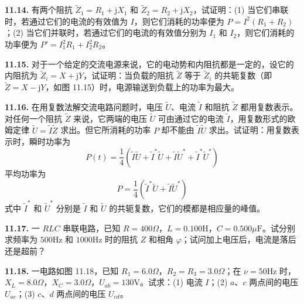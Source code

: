\begin{center}
\end{center}

\vfill
\newpage

\textbf{11.14.} 有两个阻抗 $\widetilde{Z}_1 = R_1 + \mathrm{j}X_1$ 和 $\widetilde{Z}_2 = R_2 + \mathrm{j}X_2$，试证明：(1) 当它们串联时，若通过它们的电流的有效值为 $I$，则它们消耗的功率便为 $P = I^2(R_1 + R_2)$；(2) 当它们并联时，若通过它们的电流的有效值分别为 $I_1$ 和 $I_2$，则它们消耗的功率便为 $P' = I_1^2 R_1 + I_2^2 R_2$。

\vfill
\newpage

\textbf{11.15.} 对于一个给定的交流电源来说，它的电动势和内阻抗都是一定的，设它的内阻抗为 $\widetilde{Z}_{i} = X + \mathrm{j}Y$，试证明：当负载的阻抗 $\widetilde{Z}$ 等于 $\widetilde{Z}_{i}$ 的共轭复数（即 $\widetilde{Z} = X - \mathrm{j}Y$，如图 11.15）时，电源输送到负载上的功率为最大。

\begin{center}
\end{center}

\vfill
\newpage

\textbf{11.16.} 在用复数法解交流电路问题时，电压 $\widetilde{U}$、电流 $\widetilde{I}$ 和阻抗 $\widetilde{Z}$ 都用复数表示。对任何一个阻抗 $\widetilde{Z}$ 来说，它两端的电压 $\widetilde{U}$ 可由通过它的电流 $\widetilde{I}$，用复数形式的欧姆定律 $\widetilde{U} = \widetilde{I}\widetilde{Z}$ 求出。但它所消耗的功率 $P$ 却不能由 $\widetilde{I}\widetilde{U}$ 求出。试证明：用复数表示时，瞬时功率为
\[
P(t) = \frac{1}{4}\left(\widetilde{I}\widetilde{U} + \widetilde{I}^{*}\widetilde{U} + \widetilde{I}\widetilde{U}^{*} + \widetilde{I}^{*}\widetilde{U}^{*}\right)
\]
平均功率为
\[
P = \frac{1}{4}\left(\widetilde{I}^{*}\widetilde{U} + \widetilde{I}\widetilde{U}^{*}\right)
\]
式中 $\widetilde{I}^{*}$ 和 $\widetilde{U}^{*}$ 分别是 $\widetilde{I}$ 和 $\widetilde{U}$ 的共轭复数，它们的模都是相应量的峰值。

\vfill
\newpage

\textbf{11.17.} 一 $RLC$ 串联电路，已知 $R = 400\Omega$，$L = 0.100\mathrm{H}$，$C = 0.500\mu\mathrm{F}$。试分别求频率为 $500\mathrm{Hz}$ 和 $1000\mathrm{Hz}$ 时的阻抗 $Z$ 和相角 $\varphi$；试问加上电压后，电流是落后还是超前？

\vfill
\newpage

\textbf{11.18.} 一电路如图 11.18，已知 $R_{1} = 6.0\Omega$，$R_{2} = R_{3} = 3.0\Omega$；在 $\nu = 50\mathrm{Hz}$ 时，$X_{L} = 8.0\Omega$，$X_{C} = 3.0\Omega$，$U_{ab} = 130\mathrm{V}$。试求：(1) 电流 $I$；(2) $a$、$c$ 两点间的电压 $U_{ac}$；(3) $c$、$d$ 两点间的电压 $U_{cd}$。

